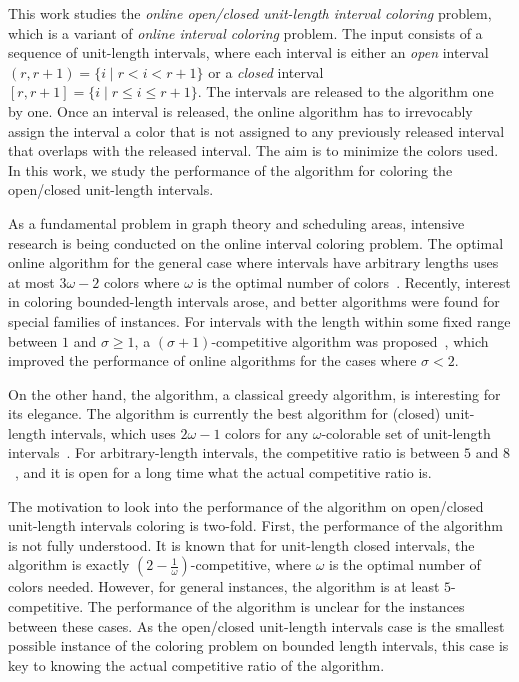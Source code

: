 This work studies the \emph{online open/closed unit-length interval coloring} problem, which is a variant of \emph{online interval coloring} problem.
The input consists of a sequence of unit-length intervals, where each interval is either an \emph{open} interval $(r, r+1) = \{ i \mid r < i < r+1 \}$ or a \emph{closed} interval $[r, r+1] = \{ i \mid r \leq i \leq r+1 \}$.
The intervals are released to the algorithm one by one.
Once an interval is released, the online algorithm has to irrevocably assign the interval a color that is not assigned to any previously released interval that overlaps with the released interval.
The aim is to minimize the colors used.
In this work, we study the performance of the \ff algorithm for coloring the open/closed unit-length intervals.

As a fundamental problem in graph theory and scheduling areas, intensive research is being conducted on the online interval coloring problem.
The optimal online algorithm for the general case where intervals have arbitrary lengths uses at most $3\omega - 2$ colors where $\omega$ is the optimal number of colors~\cite{DBLP:journals/ita/ChrobakS88, kierstead1981extremal, DBLP:conf/mfcs/Slusarek89}.
Recently, interest in coloring bounded-length intervals arose, and better algorithms were found for special families of instances. 
For intervals with the length within some fixed range between $1$ and $\sigma \geq 1$, a $(\sigma + 1)$-competitive algorithm was proposed~\cite{DBLP:journals/ejc/ChybowskaSokol24}, which improved the performance of online algorithms for the cases where $\sigma<2$.

On the other hand, the \ff algorithm, a classical greedy algorithm, is interesting for its elegance. 
The \ff algorithm is currently the best algorithm for (closed) unit-length intervals, which uses $2\omega-1$ colors for any $\omega$-colorable set of unit-length intervals~\cite{DBLP:journals/ita/ChrobakS88, DBLP:conf/icalp/EpsteinL05}.
For arbitrary-length intervals, the competitive ratio is between $5$ and $8$~\cite{DBLP:journals/ejc/KiersteadST16, DBLP:journals/order/NarayanaswamyB08}, and it is open for a long time what the actual competitive ratio is.

The motivation to look into the performance of the \ff algorithm on open/closed unit-length intervals coloring is two-fold.
First, the performance of the \ff algorithm is not fully understood. 
It is known that for unit-length closed intervals, the \ff algorithm is exactly $(2-\frac{1}{\omega})$-competitive, where $\omega$ is the optimal number of colors needed. However, for general instances, the \ff algorithm is at least $5$-competitive.
The performance of the \ff algorithm is unclear for the instances between these cases. 
As the open/closed unit-length intervals case is the smallest possible instance of the coloring problem on bounded length intervals, this case is key to knowing the actual competitive ratio of the \ff algorithm.

